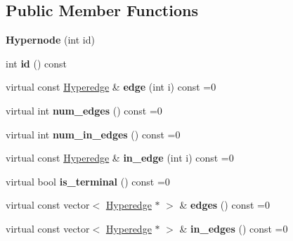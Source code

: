 \subsection*{Public Member Functions}
\begin{DoxyCompactItemize}
\item 
\hypertarget{classScarab_1_1Hypernode_a672d01c132edf291964f8f96a6884bfc}{
{\bfseries Hypernode} (int id)}
\label{classScarab_1_1Hypernode_a672d01c132edf291964f8f96a6884bfc}

\item 
\hypertarget{classScarab_1_1Hypernode_aaab8c9c93ddd67c2eed4a7afb16dd2b0}{
int {\bfseries id} () const }
\label{classScarab_1_1Hypernode_aaab8c9c93ddd67c2eed4a7afb16dd2b0}

\item 
\hypertarget{classScarab_1_1Hypernode_adeeb06397347848a0691d25410fbc85d}{
virtual const \hyperlink{classScarab_1_1Hyperedge}{Hyperedge} \& {\bfseries edge} (int i) const =0}
\label{classScarab_1_1Hypernode_adeeb06397347848a0691d25410fbc85d}

\item 
\hypertarget{classScarab_1_1Hypernode_a402d2071ac9a4ada6ef49352ba680c4a}{
virtual int {\bfseries num\_\-edges} () const =0}
\label{classScarab_1_1Hypernode_a402d2071ac9a4ada6ef49352ba680c4a}

\item 
\hypertarget{classScarab_1_1Hypernode_a7bbda2dad272154339604fda38922d85}{
virtual int {\bfseries num\_\-in\_\-edges} () const =0}
\label{classScarab_1_1Hypernode_a7bbda2dad272154339604fda38922d85}

\item 
\hypertarget{classScarab_1_1Hypernode_a07c00d976c8acf29d43f749aa8380f8f}{
virtual const \hyperlink{classScarab_1_1Hyperedge}{Hyperedge} \& {\bfseries in\_\-edge} (int i) const =0}
\label{classScarab_1_1Hypernode_a07c00d976c8acf29d43f749aa8380f8f}

\item 
\hypertarget{classScarab_1_1Hypernode_a62091ecbe9aa5e4236116b9dfb17307d}{
virtual bool {\bfseries is\_\-terminal} () const =0}
\label{classScarab_1_1Hypernode_a62091ecbe9aa5e4236116b9dfb17307d}

\item 
\hypertarget{classScarab_1_1Hypernode_a061faeb5171c17ee61b66b4014d52978}{
virtual const vector$<$ \hyperlink{classScarab_1_1Hyperedge}{Hyperedge} $\ast$ $>$ \& {\bfseries edges} () const =0}
\label{classScarab_1_1Hypernode_a061faeb5171c17ee61b66b4014d52978}

\item 
\hypertarget{classScarab_1_1Hypernode_ac9a22ced53dfc62c06861e44a0ea5c6e}{
virtual const vector$<$ \hyperlink{classScarab_1_1Hyperedge}{Hyperedge} $\ast$ $>$ \& {\bfseries in\_\-edges} () const =0}
\label{classScarab_1_1Hypernode_ac9a22ced53dfc62c06861e44a0ea5c6e}

\end{DoxyCompactItemize}
